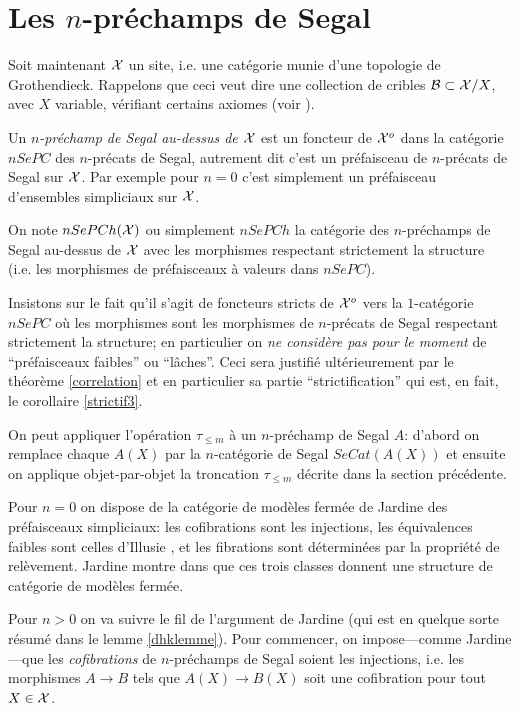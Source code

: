 \documentclass[12pt]{article}
\newcommand{\numero}[1]{\newpage\section{#1}}
\newcommand{\Bb}{{\cal B}}
\newcommand{\Xx}{{\cal X}}
\begin{document}
\numero{Les \texorpdfstring{$n$}{n}-pr\'echamps de Segal}

\label{nchampsegpage}

Soit maintenant $\Xx$ un site, i.e. une cat\'egorie munie d'une topologie de
Grothendieck. Rappelons que ceci veut dire une collection de cribles $\Bb
\subset \Xx /X$, avec $X$ variable,  v\'erifiant certains axiomes
(voir \cite{SGA4} \cite{MacLaneMoerdijk} \cite{Rezk}).


Un {\em $n$-pr\'echamp de Segal au-dessus de $\Xx$} est un foncteur de
$\Xx ^o$ dans la cat\'egorie $nSePC$ des $n$-pr\'ecats de Segal, autrement dit
c'est un pr\'efaisceau de $n$-pr\'ecats de Segal sur $\Xx$. Par exemple pour
$n=0$ c'est simplement un
pr\'efaisceau d'ensembles simpliciaux sur $\Xx$.

On note $nSePCh(\Xx )$ ou simplement $nSePCh$ la cat\'egorie des
$n$-pr\'echamps de Segal au-dessus de $\Xx$ avec les morphismes respectant
strictement la structure (i.e. les morphismes de pr\'efaisceaux \`a valeurs dans
$nSePC$).

Insistons sur le fait qu'il s'agit de foncteurs stricts de $\Xx ^o$ vers
la $1$-cat\'egorie $nSePC$ o\`u les morphismes sont les morphismes de
$n$-pr\'ecats de Segal respectant strictement la structure; en particulier
on {\em
ne consid\`ere pas pour le moment} de ``pr\'efaisceaux faibles'' ou
``l\^aches''.
Ceci sera justifi\'e ult\'erieurement par le th\'eor\`eme \ref{correlation}
et en
particulier sa partie ``strictification'' qui est, en fait, le corollaire
\ref{strictif3}.

On peut appliquer l'op\'eration $\tau _{\leq m}$ \`a un $n$-pr\'echamp de
Segal $A$:
d'abord
on remplace chaque $A(X)$ par la $n$-cat\'egorie de Segal $SeCat(A(X))$ et
ensuite on applique objet-par-objet la troncation $\tau _{\leq m}$ d\'ecrite
dans la section pr\'ec\'edente.


Pour $n=0$ on dispose de la cat\'egorie de mod\`eles ferm\'ee de Jardine
\cite{Jardine} des pr\'e\-faisceaux simpliciaux: les cofibrations sont les
injections, les \'equivalences faibles sont celles d'Illusie \cite{Illusie},
et les fibrations sont d\'etermin\'ees par la propri\'et\'e de rel\`evement.
Jardine montre dans \cite{Jardine} que ces trois classes donnent une
structure de
cat\'egorie de mod\`eles ferm\'ee.



Pour $n>0$ on va
suivre le fil de l'argument de Jardine \cite{Jardine} (qui est en quelque sorte
r\'esum\'e  dans le lemme \ref{dhklemme}).
Pour commencer, on impose---comme Jardine---que les {\em cofibrations} de
$n$-pr\'echamps de Segal soient les injections,
i.e. les morphismes $A\rightarrow B$ tels que $A(X)\rightarrow B(X)$ soit une
cofibration pour tout $X\in \Xx$.
\end{document}
